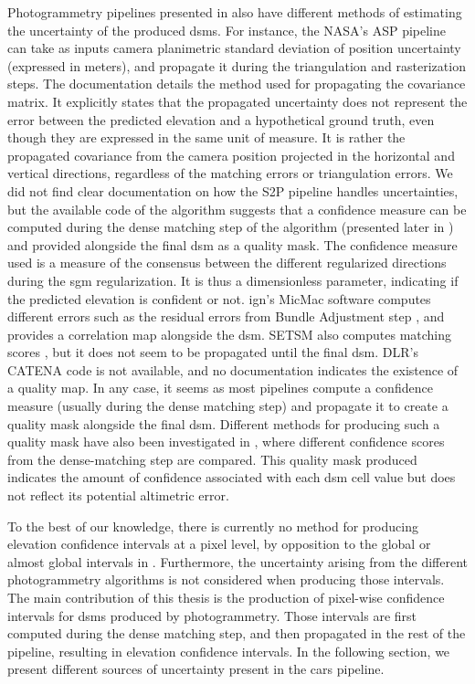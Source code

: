 Photogrammetry pipelines presented in  also have different methods of estimating the uncertainty of the produced \acrshort{dsm}s. For instance, the NASA's ASP pipeline can take as inputs camera planimetric standard deviation of position uncertainty (expressed in meters), and propagate it during the triangulation and rasterization steps. The documentation \cite{nasa_ames_2020} details the method used for propagating the covariance matrix. It explicitly states that the propagated uncertainty does not represent the error between the predicted elevation and a hypothetical ground truth, even though they are expressed in the same unit of measure. It is rather the propagated covariance from the camera position projected in the horizontal and vertical directions, regardless of the matching errors or triangulation errors. We did not find clear documentation on how the S2P pipeline handles uncertainties, but the available code of the algorithm suggests that a confidence measure can be computed during the dense matching step of the algorithm (presented later in ) and provided alongside the final \acrshort{dsm} as a quality mask. The confidence measure used is a measure of the consensus between the different regularized directions during the \acrshort{sgm} regularization. It is thus a dimensionless parameter, indicating if the predicted elevation is confident or not. \acrshort{ign}'s MicMac software computes different errors such as the residual errors from Bundle Adjustment step \cite{ign_micmac_2022}, and provides a correlation map alongside the \acrshort{dsm}. SETSM also computes matching scores \cite{noh_surface_2017}, but it does not seem to be propagated until the final \acrshort{dsm}. DLR's CATENA code is not available, and no documentation indicates the existence of a quality map. In any case, it seems as most pipelines compute a confidence measure (usually during the dense matching step) and propagate it to create a quality mask alongside the final \acrshort{dsm}. Different methods for producing such a quality mask have also been investigated in \cite{de_joinville_evaluation_2001,boudet_auto-qualification_2007}, where different confidence scores from the dense-matching step are compared. This quality mask produced indicates the amount of confidence associated with each \acrshort{dsm} cell value but does not reflect its potential altimetric error. 

To the best of our knowledge, there is currently no method for producing elevation confidence intervals at a pixel level, by opposition to the global or almost global intervals in \cite{oksanen_digital_2006,wang_robust_2015,hugonnet_uncertainty_2022}. Furthermore, the uncertainty arising from the different photogrammetry algorithms is not considered when producing those intervals. The main contribution of this thesis is the production of pixel-wise confidence intervals for \acrshort{dsm}s produced by photogrammetry. Those intervals are first computed during the dense matching step, and then propagated in the rest of the pipeline, resulting in elevation confidence intervals. In the following section, we present different sources of uncertainty present in the \acrshort{cars} pipeline. 

